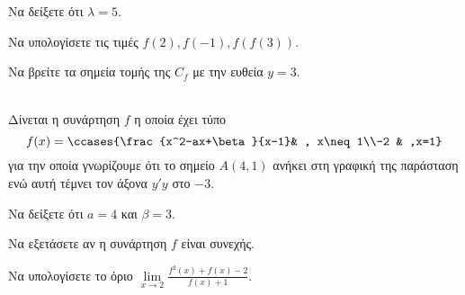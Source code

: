 \documentclass[twoside,nofonts,ektypwsh]{frontisthrio-diag}
\begin{document}
\begin{thema}
\begin{erwthma}
\item Να δείξετε ότι $ \lambda=5 $.
\item Να υπολογίσετε τις τιμές $ f(2),f(-1),f(f(3)) $.
\item Να βρείτε τα σημεία τομής της $ C_f $ με την ευθεία $ y=3 $.
\end{erwthma}
\item\mbox{}\\
Δίνεται η συνάρτηση $ f $ η οποία έχει τύπο
\[ f(x)=\ccases{\frac{x^2-ax+\beta}{x-1}& , x\neq 1\\-2 & ,x=1} \]
για την οποία γνωρίζουμε ότι το σημείο $ A(4,1) $ ανήκει στη γραφική της παράσταση ενώ αυτή τέμνει τον άξονα $ y'y $ στο $ -3 $.
\begin{erwthma}
\item Να δείξετε ότι $ a=4 $ και $ \beta=3 $.
\item Να εξετάσετε αν η συνάρτηση $ f $ είναι συνεχής.
\item Να υπολογίσετε το όριο $ \lim\limits_{x\to 2}{\frac{f^2(x)+f(x)-2}{f(x)+1}} $.
\end{erwthma}
\end{thema}
\kaliepityxia
\end{document}
